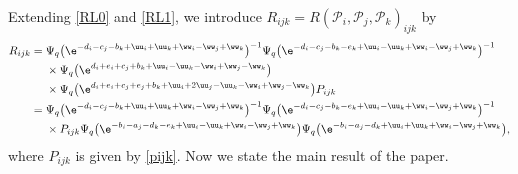Extending \eqref{RL0} and \eqref{RL1}, we introduce
$R_{ijk}=R(\mathscr{P}_i ,\mathscr{P}_j ,\mathscr{P}_k)_{ijk}$
by
\begin{align}
R_{ijk}
={}&
\Psi_q\bigl(\e^{-d_i-c_j-b_k+\uu_i+\uu_k+\ww_i-\ww_j+\ww_k}\bigr)^{-1}
\Psi_q\bigl(\e^{-d_i-c_j-b_k-e_k+\uu_i-\uu_k+\ww_i-\ww_j+\ww_k}\bigr)^{-1}
\nonumber \\
& \times
\Psi_q\bigl(\e^{d_i+e_i+c_j+b_k+\uu_i-\uu_k-\ww_i+\ww_j-\ww_k}\bigr)\nonumber \\
& \times
\Psi_q\bigl(\e^{d_i+e_i+c_j+e_j+b_k+\uu_i+2\uu_j-\uu_k-\ww_i+\ww_j-\ww_k}\bigr)P_{ijk}
\label{rijk0}\\
={}&
\Psi_q\bigl(\e^{-d_i-c_j-b_k+\uu_i+\uu_k+\ww_i-\ww_j+\ww_k}\bigr)^{-1}
\Psi_q\bigl(\e^{-d_i-c_j-b_k-e_k+\uu_i-\uu_k+\ww_i-\ww_j+\ww_k}\bigr)^{-1}
\nonumber\\
& \times P_{ijk}
\Psi_q\bigl(\e^{-b_i-a_j-d_k-e_k+\uu_i-\uu_k+\ww_i-\ww_j+\ww_k}\bigr)
\Psi_q\bigl(\e^{-b_i-a_j-d_k+\uu_i+\uu_k+\ww_i-\ww_j+\ww_k}\bigr),
\label{rijk}
\end{align}
where $P_{ijk}$ is given by \eqref{pijk}.
Now we state the main result of the paper.

